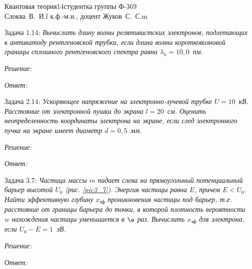 




\newcommand{\comm}[2]{\left[#1,\ #2\right]}
\newcommand{\h}{\hbar}
\newcommand{\ds}{\displaystyle}


{Квантовая теория}{}{14}{студентка группы Ф-369\\Слоква~В.~И.}{f}
{к.ф.-м.н., доцент Жуков~С.~С.}{m}
\newpage

Задача 1.14: \emph{Вычислить длину волны релятивистских электронов, подлетающих
к антикатоду рентгеновской трубки, если длина волны коротковолновой границы
сплошного рентгеновского спектра равна \( \lambda_k = 10,\!0 \)~пм.}

\vspace*{2em}
\emph{Решение:}

\vspace*{2em}
\emph{Ответ:}

\newpage

Задача 2.14: \emph{Ускоряющее напряжение на электронно-лучевой трубке
\( U = 10 \)~кВ. Расстояние от электронной пушки до экрана \( l = 20 \)~см.
Оценить неопределенность координаты электрона на экране, если след электронного
пучка на экране имеет диаметр \( d = 0,\!5 \)~мм.}

\vspace*{2em}
\emph{Решение:}

\vspace*{2em}
\emph{Ответ:}

\newpage

Задача 3.7: \emph{Частица массы \( m \) падает слева на прямоугольный
потенциальный барьер высотой \( U_0 \) (рис. \ref{pic3_7}). Энергия частицы
равна \( E \), причем \( E < U_0 \). Найти эффективную глубину
\( x_\text{эф} \) проникновения частицы под барьер, т.е. расстояние от границы
барьера до точки, в которой плотность вероятности \( w \) нахождения частицы
уменьшается в \( \e \) раз. Вычислить \( x_\text{эф} \) для электрона, если
\( U_0 - E = 1 \)~эВ.}

\vspace*{2em}
\emph{Решение:}

\vspace*{2em}
\emph{Ответ:}

